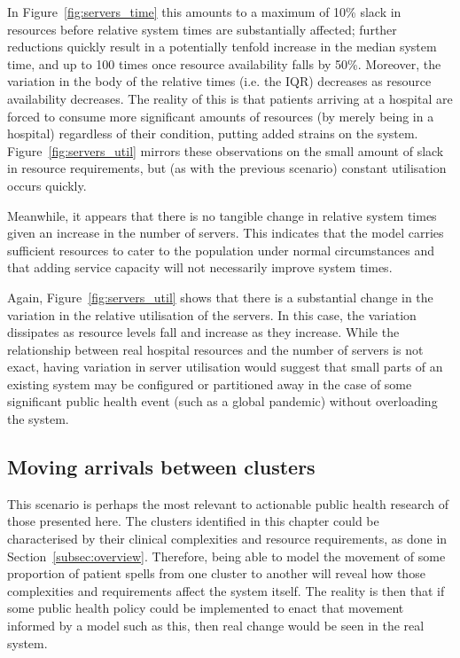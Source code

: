 In Figure~\ref{fig:servers_time} this amounts to a maximum of 10\% slack in
resources before relative system times are substantially affected; further
reductions quickly result in a potentially tenfold increase in the median system
time, and up to 100 times once resource availability falls by 50\%. Moreover,
the variation in the body of the relative times (i.e. the IQR) decreases as
resource availability decreases. The reality of this is that patients arriving
at a hospital are forced to consume more significant amounts of resources (by
merely being in a hospital) regardless of their condition, putting added strains
on the system. Figure~\ref{fig:servers_util} mirrors these observations on the
small amount of slack in resource requirements, but (as with the previous
scenario) constant utilisation occurs quickly.

Meanwhile, it appears that there is no tangible change in relative system times
given an increase in the number of servers. This indicates that the model
carries sufficient resources to cater to the population under normal
circumstances and that adding service capacity will not necessarily improve
system times.

Again, Figure~\ref{fig:servers_util} shows that there is a substantial change in
the variation in the relative utilisation of the servers. In this case, the
variation dissipates as resource levels fall and increase as they increase.
While the relationship between real hospital resources and the number of servers
is not exact, having variation in server utilisation would suggest that small
parts of an existing system may be configured or partitioned away in the case of
some significant public health event (such as a global pandemic) without
overloading the system.


\subsection{Moving arrivals between clusters}\label{subsec:moving}

This scenario is perhaps the most relevant to actionable public health research
of those presented here. The clusters identified in this chapter could be
characterised by their clinical complexities and resource requirements, as done
in Section~\ref{subsec:overview}. Therefore, being able to model the movement of
some proportion of patient spells from one cluster to another will reveal how
those complexities and requirements affect the system itself. The reality is
then that if some public health policy could be implemented to enact that
movement informed by a model such as this, then real change would be seen in the
real system.

